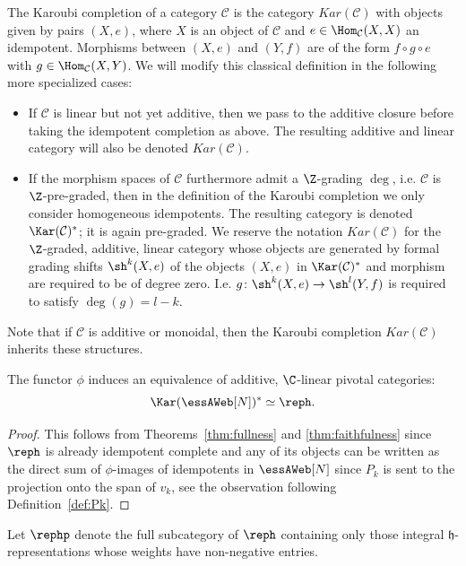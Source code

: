 \begin{defi}
The Karoubi completion of a category $\mathcal{C}$ is the category
$Kar(\mathcal{C})$ with objects given by pairs $(X,e)$, where $X$ is an object
of $\mathcal{C}$ and $e\in \Hom_\mathcal{C}(X,X)$ an idempotent. Morphisms
between $(X,e)$ and $(Y,f)$ are of the form $f\circ g \circ e$ with $g\in
\Hom_\mathcal{C}(X,Y)$. We will modify this classical definition in the following more specialized cases:
\begin{itemize}
  \item If $\mathcal{C}$ is linear but not yet additive, then we pass to the
  additive closure before taking the idempotent completion as above. The
  resulting  additive and linear category will also be denoted $Kar(\mathcal{C})$.
  \item If the morphism spaces of $\mathcal{C}$ furthermore admit a $\Z$-grading
  $\deg$, i.e. $\mathcal{C}$ is $\Z$-pre-graded, then in the definition of the
  Karoubi completion we only consider homogeneous idempotents. The resulting
  category is denoted $\Kar(\mathcal{C})^*$; it is again pre-graded. We reserve
  the notation $Kar(\mathcal{C})$ for the $\Z$-graded, additive, linear category
  whose objects are generated by formal grading shifts $\sh^k (X,e)$ of the
  objects $(X,e)$ in $\Kar(\mathcal{C})^*$ and morphism are required to be of degree
  zero. I.e. $g\colon \sh^k (X,e) \to \sh^l(Y,f)$ is required to satisfy
  $\deg(g)=l-k$.
\end{itemize}
\end{defi}

Note that if $\mathcal{C}$ is additive or monoidal, then the Karoubi completion
$Kar(\mathcal{C})$ inherits these structures.  

\begin{coro} \label{cor:diagrep} The functor $\phi$ induces an equivalence of additive, $\C$-linear pivotal categories: 
  \[
  \Kar(\essAWeb[N])^* \simeq \reph.
  \]
\end{coro}
\begin{proof} 
This follows from Theorems~\ref{thm:fullness} and \ref{thm:faithfulness} since
$\reph$ is already idempotent complete and any of its objects can be written as
the direct sum of $\phi$-images of idempotents in $\essAWeb[N]$ since $P_k$ is sent to the projection onto the span of $v_k$, see the
observation following Definition~\ref{def:Pk}.
\end{proof}

Let $\rephp$ denote the full subcategory of $\reph$ containing only those integral
$\mathfrak{h}$-representations whose weights have non-negative entries.


